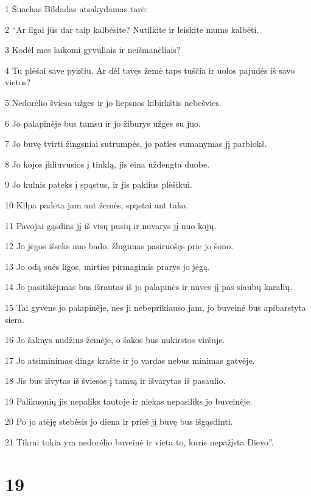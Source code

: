 \par 1 Šuachas Bildadas atsakydamas tarė: 
\par 2 “Ar ilgai jūs dar taip kalbėsite? Nutilkite ir leiskite mums kalbėti. 
\par 3 Kodėl mes laikomi gyvuliais ir neišmanėliais? 
\par 4 Tu plėšai save pykčiu. Ar dėl tavęs žemė taps tuščia ir uolos pajudės iš savo vietos? 
\par 5 Nedorėlio šviesa užges ir jo liepsnos kibirkštis nebešvies. 
\par 6 Jo palapinėje bus tamsu ir jo žiburys užges su juo. 
\par 7 Jo buvę tvirti žingsniai sutrumpės, jo paties sumanymas jį parblokš. 
\par 8 Jo kojos įkliuvusios į tinklą, jis eina uždengta duobe. 
\par 9 Jo kulnis pateks į spąstus, ir jis paklius plėšikui. 
\par 10 Kilpa padėta jam ant žemės, spąstai ant tako. 
\par 11 Pavojai gąsdins jį iš visų pusių ir nuvarys jį nuo kojų. 
\par 12 Jo jėgos išseks nuo bado, žlugimas pasiruošęs prie jo šono. 
\par 13 Jo odą suės ligos, mirties pirmagimis prarys jo jėgą. 
\par 14 Jo pasitikėjimas bus išrautas iš jo palapinės ir nuves jį pas siaubų karalių. 
\par 15 Tai gyvens jo palapinėje, nes ji nebepriklauso jam, jo buveinė bus apibarstyta siera. 
\par 16 Jo šaknys nudžius žemėje, o šakos bus nukirstos viršuje. 
\par 17 Jo atsiminimas dings krašte ir jo vardas nebus minimas gatvėje. 
\par 18 Jis bus išvytas iš šviesos į tamsą ir išvarytas iš pasaulio. 
\par 19 Palikuonių jis nepaliks tautoje ir niekas nepasiliks jo buveinėje. 
\par 20 Po jo atėję stebėsis jo diena ir prieš jį buvę bus išgąsdinti. 
\par 21 Tikrai tokia yra nedorėlio buveinė ir vieta to, kuris nepažįsta Dievo”.



\chapter{19}


